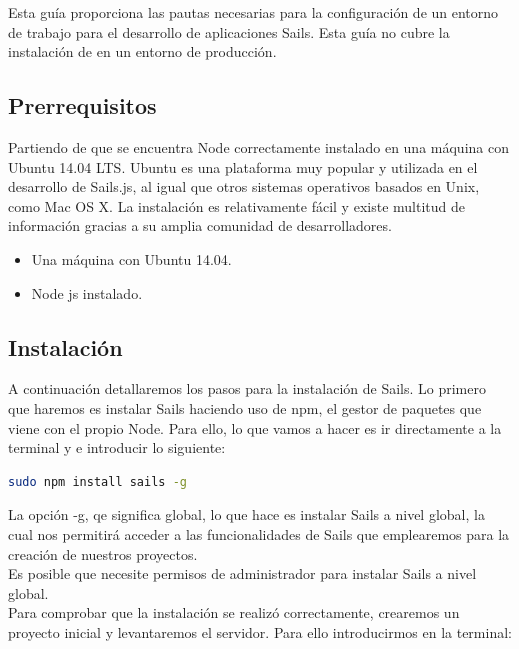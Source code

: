 Esta guía proporciona las pautas necesarias para la configuración de un entorno de trabajo para el desarrollo de aplicaciones Sails. Esta guía no cubre la instalación de en un entorno de producción.\\

\subsection{Prerrequisitos}

Partiendo de que se encuentra Node correctamente instalado en una máquina con Ubuntu 14.04 LTS. Ubuntu es una plataforma muy popular y utilizada en el desarrollo de Sails.js, al igual que otros sistemas operativos basados en Unix, como Mac OS X. La instalación es relativamente fácil y existe multitud de información gracias a su amplia comunidad de desarrolladores.\\

\begin{itemize}
\item{Una máquina con Ubuntu 14.04.}
\item{Node js instalado.}
\end{itemize}

\subsection{Instalación}

A continuación detallaremos los pasos para la instalación de Sails. Lo primero que haremos es instalar Sails haciendo uso de npm, el gestor de paquetes que viene con el propio Node. Para ello, lo que vamos a hacer es ir directamente a la terminal y e introducir lo siguiente:\\

\begin{lstlisting}[language=bash]
sudo npm install sails -g
\end{lstlisting}

La opción -g, qe significa global, lo que hace es instalar Sails a nivel global, la cual nos permitirá acceder a las funcionalidades de Sails que emplearemos para la creación de nuestros proyectos.\\

Es posible que necesite permisos de administrador para instalar Sails a nivel global.\\

Para comprobar que la instalación se realizó correctamente, crearemos un proyecto inicial y levantaremos el servidor. Para ello introducirmos en la terminal:\\

